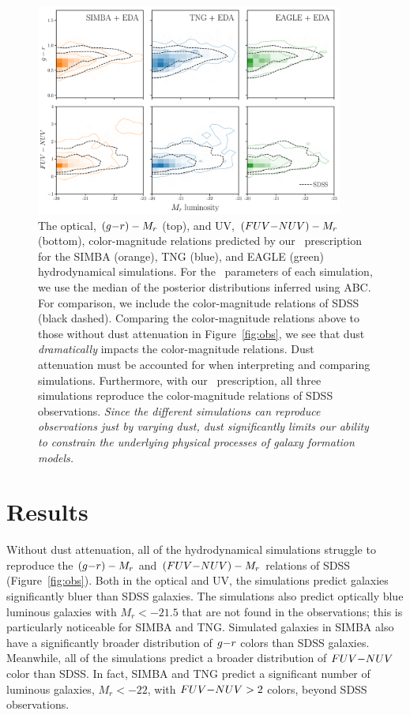 \begin{figure}
\begin{center}
    \includegraphics[width=0.9\textwidth]{figs/abc_observables.pdf}
    \caption{\label{fig:dem}
    The optical, $(g{-}r) - M_r$ (top), and UV, $(FUV{-}NUV) - M_r$ (bottom),
    color-magnitude relations predicted by our \eda~prescription
    for the SIMBA (orange), TNG (blue), and EAGLE (green) hydrodynamical
    simulations. For the \eda~parameters of each simulation, we use the
    median of the posterior distributions inferred using ABC. For
    comparison, we include the color-magnitude relations of SDSS (black
    dashed). Comparing the color-magnitude relations above to those without
    dust attenuation in Figure~\ref{fig:obs}, we see that dust
    \emph{dramatically} impacts the color-magnitude relations. 
    Dust attenuation must be accounted for when interpreting and comparing
    simulations. Furthermore, with our \eda~prescription, all three
    simulations reproduce the color-magnitude relations of SDSS
    observations.  \emph{Since the different simulations can reproduce
    observations just by varying dust, dust significantly limits our ability to
    constrain the underlying physical processes of galaxy formation
    models.}
    }
\end{center}
\end{figure}

\section{Results} \label{sec:results}
Without dust attenuation, all of the hydrodynamical simulations struggle to 
reproduce the $(g{-}r) - M_r$ and $(FUV{-}NUV) - M_r$ relations of SDSS (Figure~\ref{fig:obs}). 
Both in the optical and UV, the simulations predict galaxies significantly bluer
than SDSS galaxies.
The simulations also predict optically blue luminous galaxies with $M_r <
-21.5$ that are not found in the observations; this is particularly
noticeable for SIMBA and TNG. 
Simulated galaxies in SIMBA also have a significantly broader distribution
of $g{-}r$ colors than SDSS galaxies.
Meanwhile, all of the simulations predict a broader distribution of $FUV{-}NUV$  
color than SDSS.
In fact, SIMBA and TNG predict a significant number of luminous galaxies,
$M_r < -22$, with $FUV{-}NUV > 2$ colors, beyond SDSS observations.

